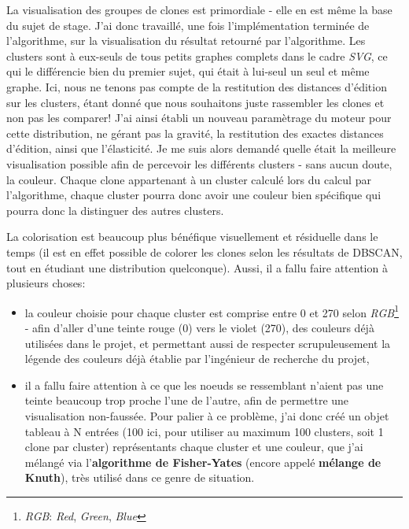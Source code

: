 \documentclass[pdftex,12pt,a4paper]{report}
\begin{document}
\begin{spacing}{1.2}
La visualisation des groupes de clones est primordiale - elle en est même la base du sujet de stage. J'ai donc travaillé, une fois l'implémentation terminée de l'algorithme, sur la visualisation du résultat retourné par l'algorithme. Les clusters sont à eux-seuls de tous petits graphes complets dans le cadre \textit{SVG}, ce qui le différencie bien du premier sujet, qui était à lui-seul un seul et même graphe. Ici, nous ne tenons pas compte de la restitution des distances d'édition sur les clusters, étant donné que nous souhaitons juste rassembler les clones et non pas les comparer! J'ai ainsi établi un nouveau paramètrage du moteur pour cette distribution, ne gérant pas la gravité, la restitution des exactes distances d'édition, ainsi que l'élasticité.
\newline
Je me suis alors demandé quelle était la meilleure visualisation possible afin de percevoir les différents clusters - sans aucun doute, la couleur. Chaque clone appartenant à un cluster calculé lors du calcul par l'algorithme, chaque cluster pourra donc avoir une couleur bien spécifique qui pourra donc la distinguer des autres clusters.

La colorisation est beaucoup plus bénéfique visuellement et résiduelle dans le temps (il est en effet possible de colorer les clones selon les résultats de DBSCAN, tout en étudiant une distribution quelconque).
\newline
Aussi, il a fallu faire attention à plusieurs choses:
	\begin{itemize}
		\item{la couleur choisie pour chaque cluster est comprise entre 0 et 270 selon \textit{RGB}\footnote{\textit{RGB}: \textit{Red}, \textit{Green}, \textit{Blue}} - afin d'aller d'une teinte rouge (0) vers le violet (270), des couleurs déjà utilisées dans le projet, et permettant aussi de respecter scrupuleusement la légende des couleurs déjà établie par l'ingénieur de recherche du projet,}
		\item{il a fallu faire attention à ce que les noeuds se ressemblant n'aient pas une teinte beaucoup trop proche l'une de l'autre, afin de permettre une visualisation non-faussée.
			\newline
			Pour palier à ce problème, j'ai donc créé un objet tableau à N entrées (100 ici, pour utiliser au maximum 100 clusters, soit 1 clone par cluster) représentants chaque cluster et une couleur, que j'ai mélangé via l'\textbf{algorithme de Fisher-Yates} (encore appelé \textbf{mélange de Knuth}), très utilisé dans ce genre de situation.}
	\end{itemize}


\end{spacing}
\end{document}
